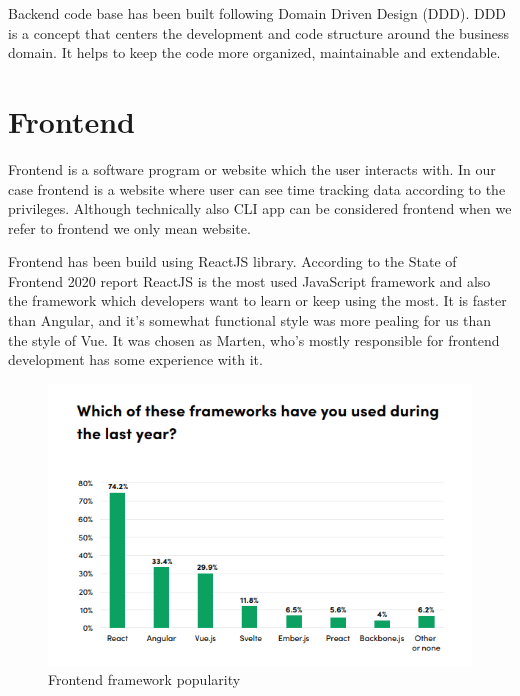 Backend code base has been built following Domain Driven Design (DDD).
DDD is a concept that centers the development and code structure around the business domain.
It helps to keep the code more organized, maintainable and extendable.



\section{Frontend}\label{sec:frontend}
Frontend is a software program or website which the user interacts with.
In our case frontend is a website where user can see time tracking data according to the privileges.
Although technically also CLI app can be considered frontend when we refer to frontend we only mean website.

Frontend has been build using ReactJS library.
According to the State of Frontend 2020 report ReactJS is the most used JavaScript framework and also the framework which developers want to learn or keep using the most.
It is faster than Angular, and it's somewhat functional style was more pealing for us than the style of Vue.
It was chosen as Marten, who's mostly responsible for frontend development has some experience with it.

\begin{figure}[h]
    \includegraphics[width=\textwidth]{figures/frontend_framework_popularity.png}
    \caption{Frontend framework popularity}
    \label{fig:frontend-framework-popularity}
\end{figure}

